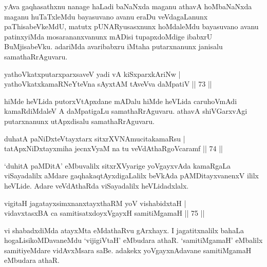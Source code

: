 \begin{artha}
yAva gaqhasathxnu nanage haLadi baNaNxda maganu athavA hoMbaNaNxda maganu huTaTxleMdu bayasuvano avanu eraDu veVdagaLanunx paThisabeVkeMdU, matutx pUNARyusasxnunx hoMdaleMdu bayasuvano avanu patinxyiMda mosarananxvanunx mADisi tupapxdoMdige ibabxrU BuMjisabeVku. adariMda avaribabxru iMtaha putarxnanunx janisalu samathaRrAguvaru.
\end{artha}

\begin{shl}
yathoVkatxputarxparxsaveV yadi vA kiSxparxkAriNw | \\
yathoVkatxkamaRNeYteVna sAyxtAM tAveVva daMpatiV \hfill|| 73 || 
\end{shl}

\begin{artha}
hiMde heVLida putorxVtApxdane mADalu hiMde heVLida caruhoVmAdi kamaRdiMdaleV A daMpatigaLu samathaRrAguvaru. athavA shiVGarxvAgi putarxnanunx utApxdisalu samathaRrAguvaru.
\end{artha}


\begin{shl}
duhatA paNiDxteVtayxtarx sitxrXVNAmucitakamaRsu | \\
tatApxNiDxtayxmiha jecnxVyaM na tu veVdAthaRgoVcaramf \hfill|| 74 || 
\end{shl}

\begin{artha}
`duhitA paMDitA' eMbuvalilx sitxrXVyarige yoVgayxvAda kamaRgaLa viSayadalilx aMdare gaqhakaqtAyxdigaLalilx beVkAda pAMDitayxvanenxV ililx heVLide. Adare veVdAthaRda viSayadalilx heVLidadxlalx.
\end{artha}


\begin{shl}
vigitaH jagatayxsimxnanxtayxthaRM yoV vishabidxtaH | \\
vidavxtasxBA ca samitisatxdoyxVgayxH samitiMgamaH \hfill|| 75 || 
\end{shl}

\begin{artha}
vi shabadxdiMda atayxMta eMdathaRvu gArxhayx. I jagatitxnalilx bahaLa hogaLisikoMDavaneMdu `vijigiVtaH' eMbudara athaR. `samitiMgamaH' eMbalilx samitiyeMdare vidAvxMsara saBe. adakekx yoVgayxnAdavane samitiMgamaH eMbudara athaR.
\end{artha}

